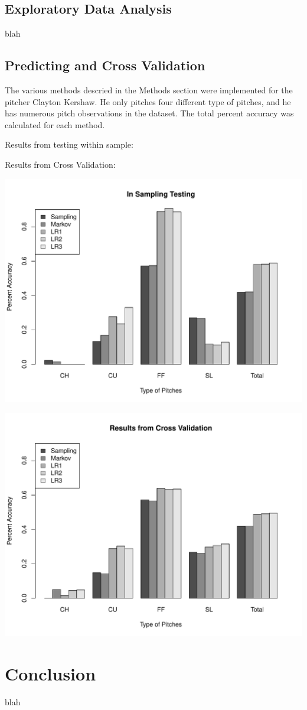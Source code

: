 \documentclass{article}
\begin{document}
\subsection{Exploratory Data Analysis}

blah
\subsection{Predicting and Cross Validation}

The various methods descried in the Methods section were implemented for the pitcher Clayton Kershaw. He only pitches four different type of pitches, and he has numerous pitch observations in the dataset. The total percent accuracy was calculated for each method. 

Results from testing within sample:



Results from Cross Validation:




\begin{center}
		\includegraphics[scale = .7]{NOT_CV.pdf}
\end{center}

\begin{center}
		\includegraphics[scale = .7]{CV.pdf}
\end{center}


\section{Conclusion}

blah
\end{document}
